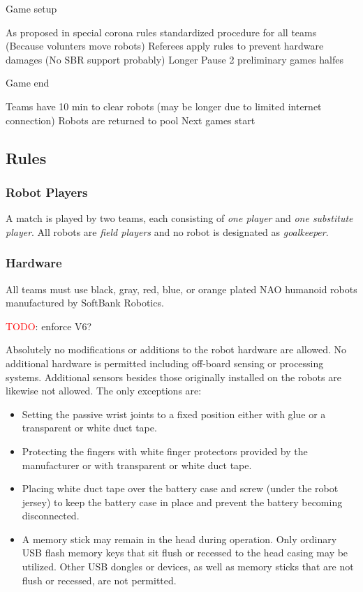Game setup

    As proposed in special corona rules
    standardized procedure for all teams (Because volunters move robots)
    Referees apply rules to prevent hardware damages (No SBR support probably)
    Longer Pause
    2 preliminary games halfes

Game end

    Teams have 10 min to clear robots (may be longer due to limited internet connection)
    Robots are returned to pool
    Next games start



\subsection{Rules}

\subsubsection{Robot Players}
\label{sec:robot_players}
A match is played by two teams, each consisting of \emph{one player} and \emph{one substitute player}. All robots are \emph{field players} and no robot is designated as \emph{goalkeeper}.

\subsubsection{Hardware}
\label{sec:hardware}
All teams must use black, gray, red, blue, or orange plated NAO humanoid robots manufactured by SoftBank Robotics.

\textcolor{red}{TODO}: enforce V6?

Absolutely no modifications or additions to the robot hardware are allowed. No additional hardware is permitted including off-board sensing or processing systems. Additional sensors besides those originally installed on the robots are likewise not allowed. The only exceptions are:
\begin{itemize}
	\item Setting the passive wrist joints to a fixed position either with glue or a transparent or white duct tape.
	\item Protecting the fingers with white finger protectors provided by the manufacturer or with transparent or white duct tape.
	\item Placing white duct tape over the battery case and screw (under the robot jersey) to keep the battery case in place and prevent the battery becoming disconnected.
	\item A memory stick may remain in the head during operation.  Only ordinary USB flash memory keys that sit flush or recessed to the head casing may be utilized. Other USB dongles or devices, as well as memory sticks that are not flush or recessed, are not permitted.
\end{itemize}

